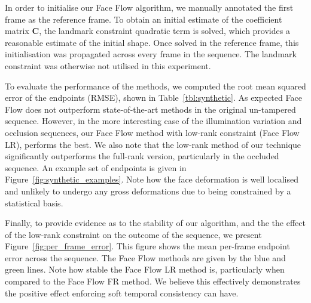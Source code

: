 In order to initialise our Face Flow algorithm, we manually annotated the first frame
as the reference frame. To obtain an initial estimate of the coefficient
matrix $\mathbf{C}$, the landmark constraint quadratic term is solved, which
provides a reasonable estimate of the initial shape. Once solved in the reference frame,
this initialisation was propagated across every frame in the sequence. The landmark constraint
was otherwise not utilised in this experiment.

To evaluate the performance of the methods, we computed the root mean squared
error of the endpoints (RMSE), shown in Table~\ref{tbl:synthetic}. As expected
Face Flow does not outperform state-of-the-art methods in the original un-tampered
sequence. However, in the more interesting case of the illumination variation
and occlusion sequences, our Face Flow method with low-rank constraint (Face Flow LR),
performs the best. We also note that the low-rank method of our technique significantly
outperforms the full-rank version, particularly in the occluded sequence. An example
set of endpoints is given in Figure~\ref{fig:synthetic_examples}. Note how
the face deformation is well localised and unlikely to undergo any gross deformations
due to being constrained by a statistical basis.

Finally, to provide evidence as to the stability of our algorithm, and the the effect
of the low-rank constraint on the outcome of the sequence, we present Figure~\ref{fig:per_frame_error}.
This figure shows the mean per-frame endpoint error across the sequence. The Face Flow
methods are given by the blue and green lines. Note how stable the Face Flow LR method is,
particularly when compared to the Face Flow FR method. We believe this effectively
demonstrates the positive effect enforcing soft temporal consistency can have.
